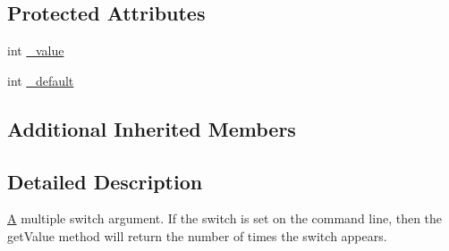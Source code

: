 \subsection*{Protected Attributes}
\begin{DoxyCompactItemize}
\item 
int \hyperlink{class_t_c_l_a_p_1_1_multi_switch_arg_ab488d4bcdde96fc9edea87ee9b6f5839}{\+\_\+value}
\item 
int \hyperlink{class_t_c_l_a_p_1_1_multi_switch_arg_afcd5b3e418e455af3d31aec1e300bb74}{\+\_\+default}
\end{DoxyCompactItemize}
\subsection*{Additional Inherited Members}


\subsection{Detailed Description}
\hyperlink{class_a}{A} multiple switch argument. If the switch is set on the command line, then the get\+Value method will return the number of times the switch appears. 

